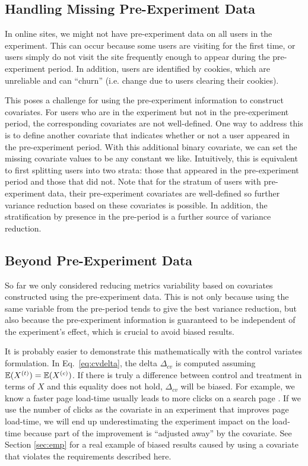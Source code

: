 \documentclass{sig-alternate}
\begin{document}
\subsection{Handling Missing Pre-Experiment Data}
In online sites, we might not have pre-experiment data on all users in the experiment. This can occur because some users are visiting for the first time, or users simply do not visit the site frequently enough to appear during the pre-experiment period. In addition, users are identified by cookies, which are unreliable and can ``churn'' (i.e. change due to users clearing their cookies).

This poses a challenge for using the pre-experiment information to construct covariates. For users who are in the experiment but not in the pre-experiment period, the corresponding covariates are not well-defined. One way to address this is to define another covariate that indicates whether or not a user appeared in the pre-experiment period. With this additional binary covariate, we can set the missing covariate values to be any constant we like. Intuitively, this is equivalent to first splitting users into two strata: those that appeared in the pre-experiment period and those that did not. Note that for the stratum of users with pre-experiment data, their pre-experiment covariates are well-defined so further variance reduction based on these covariates is possible. In addition, the stratification by presence in the pre-period is a further source of variance reduction. 

\subsection{Beyond Pre-Experiment Data}\label{sec:beyond}
So far we only considered reducing metrics variability based on covariates constructed using the pre-experiment data. This is not only because using the same variable from the pre-period tends to give the best variance reduction, but also because the pre-experiment information is guaranteed to be independent of the experiment's effect, which is crucial to avoid biased results.   

It is probably easier to demonstrate this mathematically with the control variates formulation. In Eq.~\eqref{eq:cvdelta}, the delta $\Delta_{cv}$ is computed assuming $\mathbb{E}(X^{(t)})=\mathbb{E}(X^{(c)})$. If there is truly a difference between control and treatment in terms of $X$ and this equality does not hold, $\Delta_{cv}$ will be biased. For example, we know a faster page load-time usually leads to more clicks on a search page \citep{expsurvey}. If we use the number of clicks as the covariate in an experiment that improves page load-time, we will end up underestimating the experiment impact on the load-time because part of the improvement is ``adjusted away'' by the covariate. See Section \ref{sec:emp} for a real example of biased results caused by using a covariate that violates the requirements described here. 
\end{document}
